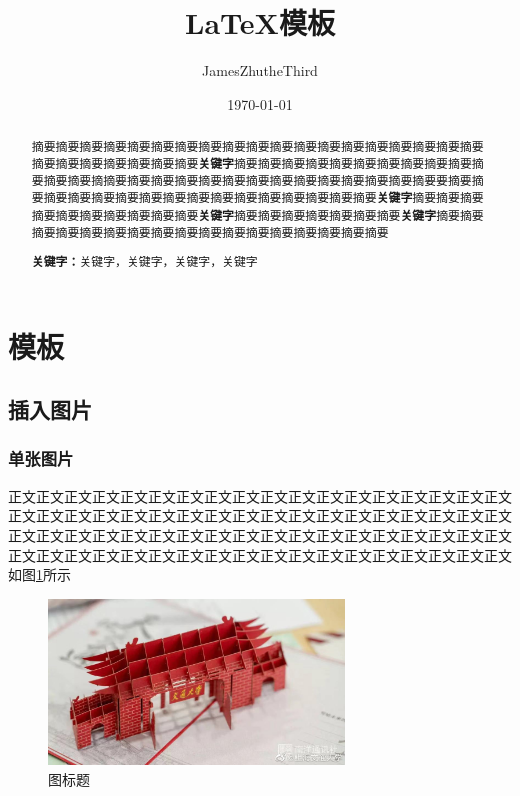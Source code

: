 \documentclass[a4paper]{article}
\title{\LaTeX 模板}
\author{JamesZhutheThird}
\date{\today}
\begin{document}
\thispagestyle{fancy}
\maketitle

\begin{abstract}
摘要摘要摘要摘要摘要摘要摘要摘要摘要摘要摘要摘要摘要摘要摘要摘要摘要摘要摘要摘要摘要摘要摘要摘要摘要摘要\textbf{关键字}摘要摘要摘要摘要摘要摘要摘要摘要摘要摘要摘要摘要摘要摘摘要摘要摘要摘要摘要摘要摘要摘要摘要摘要摘要摘要摘要摘要要摘要摘要摘要摘要摘要摘要摘要摘要摘要摘要摘要摘要摘要摘要摘要摘要\textbf{关键字}摘要摘要摘要摘要摘要摘要摘要摘要摘要摘要\textbf{关键字}摘要摘要摘要摘要摘要摘要摘要\textbf{关键字}摘要摘要摘要摘要摘要摘要摘要摘要摘要摘要摘要摘要摘要摘要摘要摘要摘要
\par\textbf{关键字：}关键字，关键字，关键字，关键字
\end{abstract}


\section{模板}
\subsection{插入图片}
\subsubsection{单张图片}
正文正文正文正文正文正文正文正文正文正文正文正文正文正文正文正文正文正文正文正文正文正文正文正文正文正文正文正文正文正文正文正文正文正文正文正文正文正文正文正文正文正文正文正文正文正文正文正文正文正文正文正文正文正文正文正文正文正文正文正文正文正文正文正文正文正文正文正文正文正文正文正文如图\ref{fig1}所示

\begin{figure}[!h]
	\centering
	\vspace{0cm}
	\includegraphics[width=0.7\textwidth,trim=50 100 200 75,clip]{figures/fig1.jpg}%
	\vspace{0cm}
	\caption{图标题}
	\label{fig1}
\end{figure}
\end{document}

